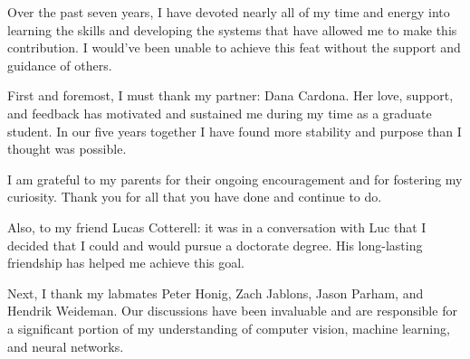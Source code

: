 \documentclass[chap]{thesis}
\author{Jonathan P. Crall
}
\begin{document}
\newcommand{\fnote}[1]{ (#1)}
\ifpublishversion{}
    \newcommand{\devcomment}[1]{}
    \newcommand{\chuckcomment}[1]{}
    \newcommand{\caplbl}[1]{}
\else
    \newcommand{\caplbl}[1]{\red(#1)\black\xspace}
    \newcommand{\devcomment}[1]{\marginpar{\scriptsize{\darkgreen{}\textbf{#1}\black{}}}}
    \newcommand{\chuckcomment}[1]{\marginpar{\scriptsize{\chuckblue{}\textbf{#1}\black{}}}}
\fi




\titlepage{}

\tableofcontents{}        

\listoftables{}          %
\listoffigures{}         %


Over the past seven years, I have devoted nearly all of my time and energy into learning the skills and
  developing the systems that have allowed me to make this contribution.
I would've been unable to achieve this feat without the support and guidance of others.

First and foremost, I must thank my partner: Dana Cardona.
Her love, support, and feedback has motivated and sustained me during my time as a graduate student.
In our five years together I have found more stability and purpose than I thought was possible.

I am grateful to my parents for their ongoing encouragement and for fostering my curiosity.
Thank you for all that you have done and continue to do.

Also, to my friend Lucas Cotterell:
it was in a conversation with Luc that I decided that I could and would pursue a doctorate degree.
His long-lasting friendship has helped me achieve this goal.

Next, I thank my labmates Peter Honig, Zach Jablons, Jason Parham, and Hendrik Weideman.
Our discussions have been invaluable and are responsible for a significant portion of my understanding of
  computer vision, machine learning, and neural networks.
\end{document}
